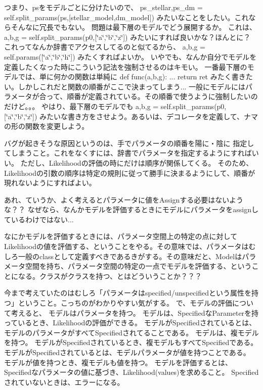 つまり、psをモデルごとに分けたいので、 ps\+\_\+stellar,ps\+\_\+dm = self.\+split\+\_\+params(ps,\mbox{[}stellar\+\_\+model,dm\+\_\+model\mbox{]}) みたいなことをしたい。これならそんなに冗長でもない。 問題は最下層のモデルでどう展開するか。 これは、 a,b,g = self.\+split\+\_\+params(p0,\mbox{[}\char`\"{}a\char`\"{},\char`\"{}b\char`\"{},\char`\"{}z\char`\"{}\mbox{]}) みたいにすれば良いかな？ほんとに？ これってなんか辞書でアクセスしてるのと似てるから、 a,b,g = self.\+params(\mbox{[}\char`\"{}a\char`\"{},\char`\"{}b\char`\"{},\char`\"{}h\char`\"{}\mbox{]}) みたくすればよいか。 いやでも、なんか自分でモデルを定義したくなった時にこういう記法を強制させるのはキモい。 一番最下層のモデルでは、単に何かの関数は単純に def func(a,b,g)\+: ... return ret みたく書きたい。しかしこれだと関数の順番がここで決まってしまう... 一般にモデルにはパラメータが合って、順番が定義されている。その順番で使うように強制したいのだけど。。。 やはり、最下層のモデルでも a,b,g = self.\+split\+\_\+params(p0,\mbox{[}\char`\"{}a\char`\"{},\char`\"{}b\char`\"{},\char`\"{}z\char`\"{}\mbox{]}) みたいな書き方をさせよう。あるいは、デコレータを定義して、ナマの形の関数を変更しよう。

バグが起きそうな原因というのは、手でパラメータの順番を陽に・陰に 指定してしまうこと。これをなくすには、辞書でパラメータを指定するようにすればいい。 ただし、\+Likelihoodの評価の時にだけは順序が関係してくる。 そのため、\+Likelihoodの引数の順序は特定の規則に従って勝手に決まるようにして、順番が現れないようにすればよい。

あれ、ていうか、よく考えるとパラメータに値を\+Assignする必要はないような？？ なぜなら、なんかモデルを評価するときにモデルにパラメータをassignしているわけではない...

なにかモデルを評価するときには、パラメータ空間上の特定の点に対して\+Likelihoodの値を評価する、ということをやる。その意味では、パラメータはむしろ一般のclassとして定義すべきであるきがする。その意味だと、\+Modelはパラメータ空間を持ち、パラメータ空間の特定の一点でモデルを評価する、ということになる。クラスがクラスを持つ、とはどういうことか？？？

今まで考えていたのはむしろ「パラメータはspecified/unspecifiedという属性を持つ」ということ。こっちのがわかりやすい気がする。 で、モデルの評価について考えると、 モデルはパラメータを持つ。 モデルは、\+Specifiedな\+Parameterを持っているとき、\+Likelihoodの評価ができる。 モデルが\+Specifiedされているとは、モデルのパラメータがすべて\+Specifiedされてることである。 モデルは、複モデルを持つ。 モデルが\+Specifiedされているとき、複モデルもすべて\+Specifiedである。 モデルが\+Specifiedされているとは、モデルパラメータが値を持つことである。 モデルが値を持つとき、複モデルも値を持つ。 モデルを評価するとは、 Specifiedなパラメータの値に基づき、\+Likelihood(values)を求めること。 Specifiedされていないときは、エラーになる。

